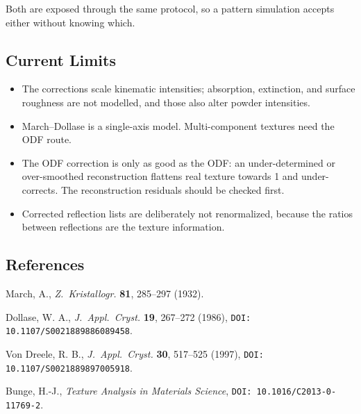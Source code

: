 Both are exposed through the same protocol, so a pattern simulation accepts
either without knowing which.

\subsection{Current Limits}

\begin{itemize}
  \item The corrections scale kinematic intensities; absorption, extinction, and
        surface roughness are not modelled, and those also alter powder
        intensities.
  \item March--Dollase is a single-axis model. Multi-component textures need the
        ODF route.
  \item The ODF correction is only as good as the ODF: an under-determined or
        over-smoothed reconstruction flattens real texture towards 1 and
        under-corrects. The reconstruction residuals should be checked first.
  \item Corrected reflection lists are deliberately not renormalized, because
        the ratios between reflections are the texture information.
\end{itemize}

\subsection{References}

March, A., \emph{Z.\ Kristallogr.} \textbf{81}, 285--297 (1932).

Dollase, W. A., \emph{J.\ Appl.\ Cryst.} \textbf{19}, 267--272 (1986),
\texttt{DOI: 10.1107/S0021889886089458}.

Von Dreele, R. B., \emph{J.\ Appl.\ Cryst.} \textbf{30}, 517--525 (1997),
\texttt{DOI: 10.1107/S0021889897005918}.

Bunge, H.-J., \emph{Texture Analysis in Materials Science},
\texttt{DOI: 10.1016/C2013-0-11769-2}.
